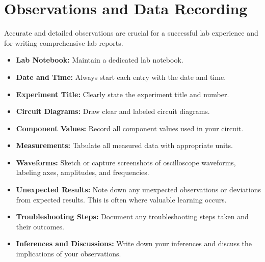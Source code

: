 \section*{Observations and Data Recording}
Accurate and detailed observations are crucial for a successful lab experience and for writing
comprehensive lab reports.
\begin{itemize}
	\item \textbf{Lab Notebook:} Maintain a dedicated lab notebook.
	\item \textbf{Date and Time:} Always start each entry with the date and time.
	\item \textbf{Experiment Title:} Clearly state the experiment title and number.
	\item \textbf{Circuit Diagrams:} Draw clear and labeled circuit diagrams.
	\item \textbf{Component Values:} Record all component values used in your circuit.
	\item \textbf{Measurements:} Tabulate all measured data with appropriate units.
	\item \textbf{Waveforms:} Sketch or capture screenshots of oscilloscope waveforms, labeling axes,
	amplitudes, and frequencies.
	\item \textbf{Unexpected Results:} Note down any unexpected observations or deviations from
	expected results. This is often where valuable learning occurs.
	\item \textbf{Troubleshooting Steps:} Document any troubleshooting steps taken and their outcomes.
	\item \textbf{Inferences and Discussions:} Write down your inferences and discuss the implications of
	your observations.
\end{itemize}

